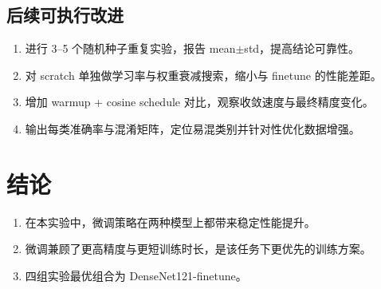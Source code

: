 \documentclass[a4paper,10pt,twocolumn]{article}
\begin{document}
\subsection{后续可执行改进}
\begin{enumerate}
  \item 进行 3--5 个随机种子重复实验，报告 mean$\pm$std，提高结论可靠性。
  \item 对 scratch 单独做学习率与权重衰减搜索，缩小与 finetune 的性能差距。
  \item 增加 warmup + cosine schedule 对比，观察收敛速度与最终精度变化。
  \item 输出每类准确率与混淆矩阵，定位易混类别并针对性优化数据增强。
\end{enumerate}

\section{结论}
\begin{enumerate}
  \item 在本实验中，微调策略在两种模型上都带来稳定性能提升。
  \item 微调兼顾了更高精度与更短训练时长，是该任务下更优先的训练方案。
  \item 四组实验最优组合为 DenseNet121-finetune。
\end{enumerate}
\end{document}
